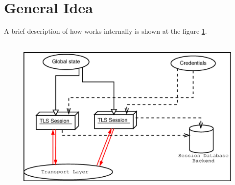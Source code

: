\section{General Idea}
A brief description of how \gnutls{} works internally is shown at
the figure \ref{fig:internals}.

\begin{figure}[htp]
\includegraphics[height=8cm,width=12cm]{internals}
\label{fig:internals}
\end{figure}




